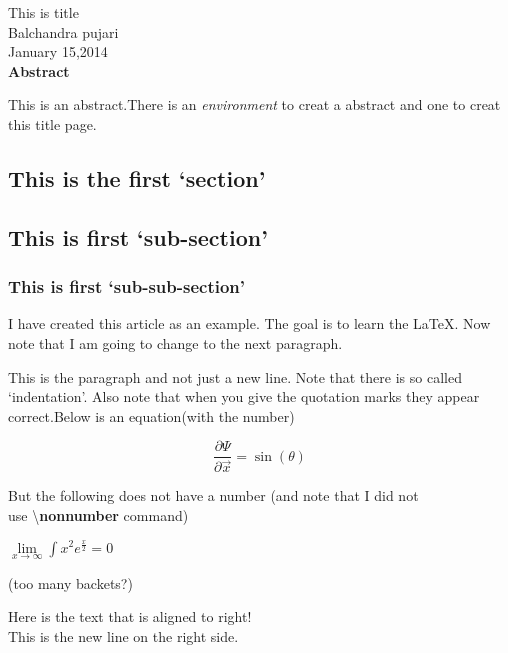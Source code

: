 \documentclass[11pt]{article}
\begin{document}
\begin{center}
{\huge This is title}
\vspace{10 mm}
{\\ \Large{Balchandra pujari}}
\vspace{5 mm}
{\\ \normalsize{January 15,2014}}
\vspace{10 mm}
\small \bf{\\Abstract}
\end{center}
\begin{flushleft}
\hspace{3 mm}
{This is an abstract.There is an {\it environment} to creat a abstract and one to creat this title page.}
\end{flushleft}
\vspace{3 mm}
\begin{flushleft}
\section{\Large\bf This is the first `section'}
\subsection{\normalsize This is first `sub-section'}
\subsubsection{\small This is first `sub-sub-section'}
 I have created this article as an example. The goal is to learn the \LaTeX{}. \break Now note that I am going to change to the next paragraph.
\par \hspace{3mm} This is the paragraph and not just a new line. Note that there is so \break called `indentation'. Also note that when you give the quotation marks \nolinebreak they \newline appear correct.Below is an equation(with the number)
\end{flushleft}
\begin{center}
\begin{equation}
\frac{\partial \Psi}{\partial \vec{x}}=\sin({\theta})
\end{equation}
\end{center}
\begin{flushleft}
{\normalsize But the following does not have a number (and note that I did not \\ use \textbackslash {\bf nonnumber} command)}
\end{flushleft}
\begin{center}
$\lim \limits_{x \rightarrow \infty} \int{x^2}{e^{\frac{x}{2}}}=0$
\end{center}
\begin{flushleft}
{(too many backets?)}
\end{flushleft}
\begin{flushright}
{Here is the text that is aligned to right!\\This is the new line on the right side.}
\end{flushright}
\end{document}
